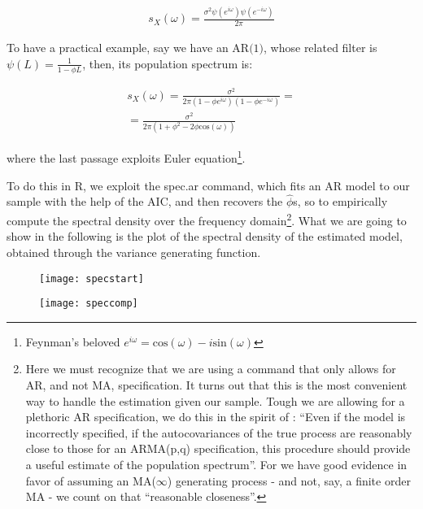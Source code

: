 \documentclass[12pt]{article} %
\begin{document}
\begin{equation}
\begin{aligned}
s_X(\omega)=\frac{\sigma^2\psi(e^{i\omega})\psi(e^{-i\omega})}{2\pi}
\end{aligned}
\end{equation}

To have a practical example, say we have an $\text{AR(1)}$, whose related filter is $\psi(L)=\frac{1}{1-\phi L}$, then, its population spectrum is:

\begin{equation}
\begin{aligned}
s_X(\omega)=\frac{\sigma^2}{2\pi(1-\phi e^{i\omega})(1-\phi e^{-i\omega})}=\\
=\frac{\sigma^2}{2\pi(1+\phi^2-2\phi\text{cos}(\omega))}
\end{aligned}
\end{equation}

where the last passage exploits Euler equation\footnote{
Feynman's beloved $e^{i\omega}=\text{cos}(\omega)-i\text{sin}(\omega)$}.

To do this in R, we exploit the spec.ar command, which fits an AR model to our sample with the help of the AIC, and then recovers the $\hat{\phi}$s, so to empirically compute the spectral density over the frequency domain\footnote{Here we must recognize that we are using a command that only allows for AR, and not MA, specification. It turns out that this is the most convenient way to handle the estimation given our sample. Tough we are allowing for a plethoric AR specification, we do this in the spirit of \citet[p.165]{hammy}: ``Even if the model is incorrectly specified, if the autocovariances of the true process are reasonably close to those for an ARMA(p,q) specification, this procedure should provide a useful estimate of the population spectrum''. For we have good evidence in favor of assuming an MA($\infty$) generating process - and not, say, a finite order MA -  we count on that ``reasonable closeness''.}. What we are going to show in the following is the plot of the spectral density of the estimated model, obtained through the variance generating function.

\begin{figure}[H]
\begin{center}
\texttt{[image: specstart]}
\caption{}
\end{center}
\end{figure}

\begin{figure}[H]
\begin{center}
\texttt{[image: speccomp]}
\caption{}
\end{center}
\end{figure}
\end{document}
